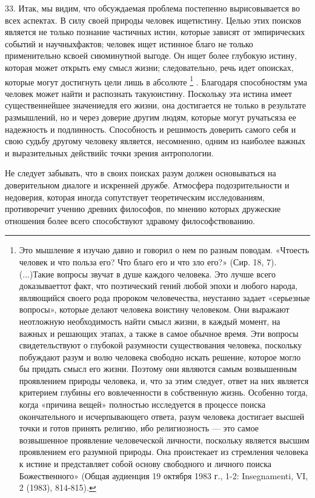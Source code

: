 \documentclass[a5paper,10pt]{article}
\begin{document}
33. Итак, мы видим, что обсуждаемая проблема постепенно вырисовывается во всех
аспектах. В силу своей природы человек ищетистину. Целью этих поисков является
не только познание частичных истин, которые зависят от эмпирических событий и
научныхфактов; человек ищет истинное благо не только применительно ксвоей
сиюминутной выгоде. Он ищет более глубокую истину, которая может открыть ему
смысл жизни; следовательно, речь идет опоисках, которые могут достигнуть цели
лишь в абсолюте \footnote{Это мышление я изучаю давно и говорил о нем по разным
    поводам. «Чтоесть человек и что польза его? Что благо его и что зло его?»
    (Сир. 18, 7). (...)Такие вопросы звучат в душе каждого человека. Это лучше
    всего доказываеттот факт, что поэтический гений любой эпохи и любого
    народа, являющийся своего рода пророком человечества, неустанно задает
    «серьезные вопросы», которые делают человека воистину человеком. Они
    выражают неотложную необходимость найти смысл жизни, в каждый момент, на
    важных и решающих этапах, а также в самое обычное время. Эти вопросы
    свидетельствуют о глубокой разумности существования человека, поскольку
    побуждают разум и волю человека свободно искать решение, которое могло бы
    придать смысл его жизни. Поэтому они являются самым возвышенным проявлением
    природы человека, и, что за этим следует, ответ на них является критерием
    глубины его вовлеченности в собственную жизнь. Особенно тогда, когда
    «причина вещей» полностью исследуется в процессе поиска окончательного и
    исчерпывающего ответа, разум человека достигает высшей точки и готов
    принять религию, ибо религиозность — это самое возвышенное проявление
    человеческой личности, поскольку является высшим проявлением его разумной
    природы. Она проистекает из стремления человека к истине и представляет
    собой основу свободного и личного поиска Божественного» (Общая аудиенция 19
октября 1983 г., 1-2: Insegnamenti, VI, 2 (1983), 814-815).}  . Благодаря
способностям ума человек может найти и распознать такуюистину. Поскольку эта
истина имеет существеннейшее значениедля его жизни, она достигается не только в
результате размышлений, но и через доверие другим людям, которые могут
ручатьсяза ее надежность и подлинность.  Способность и решимость доверить
самого себя и свою судьбу другому человеку является, несомненно, одним из
наиболее важных и выразительных действийс точки зрения антропологии.

Не следует забывать, что в своих поисках разум должен основываться на
доверительном диалоге и искренней дружбе. Атмосфера подозрительности и
недоверия, которая иногда сопутствует теоретическим исследованиям, противоречит
учению древних философов, по мнению которых дружеские отношения более всего
способствуют здравому философствованию.
\end{document}
